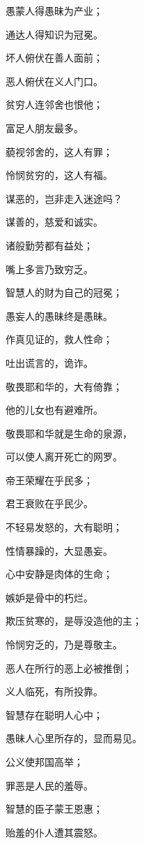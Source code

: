 {\par }{\Q {}愚蒙人得愚昧为产业；
\par }{\Q 通达人得知识为冠冕。
\par }{\Q {}坏人俯伏在善人面前；
\par }{\Q 恶人俯伏在义人门口。
\par }{\Q {}贫穷人连邻舍也恨他；
\par }{\Q 富足人朋友最多。
\par }{\Q {}藐视邻舍的，这人有罪；
\par }{\Q 怜悯贫穷的，这人有福。
\par }{\Q {}谋恶的，岂非走入迷途吗？
\par }{\Q 谋善的，{}慈爱和诚实。
\par }{\Q {}诸般勤劳都有益处；
\par }{\Q 嘴上多言乃致穷乏。
\par }{\Q {}智慧人的财为自己的冠冕；
\par }{\Q 愚妄人的愚昧终是愚昧。
\par }{\Q {}作真见证的，救人性命；
\par }{\Q 吐出谎言的，{}诡诈。
\par }{\Q {}敬畏耶和华的，大有倚靠；
\par }{\Q 他的儿女也有避难所。
\par }{\Q {}敬畏耶和华就是生命的泉源，
\par }{\Q 可以使人离开死亡的网罗。
\par }{\Q {}帝王荣耀在乎民多；
\par }{\Q 君王衰败在乎民少。
\par }{\Q {}不轻易发怒的，大有聪明；
\par }{\Q 性情暴躁的，大显愚妄。
\par }{\Q {}心中安静是肉体的生命；
\par }{\Q 嫉妒是骨中的朽烂。
\par }{\Q {}欺压贫寒的，是辱没造他的主；
\par }{\Q 怜悯穷乏的，乃是尊敬主。
\par }{\Q {}恶人在所行的恶上必被推倒；
\par }{\Q 义人临死，有所投靠。
\par }{\Q {}智慧存在聪明人心中；
\par }{\Q 愚昧人心里所存的，显而易见。
\par }{\Q {}公义使邦国高举；
\par }{\Q 罪恶是人民的羞辱。
\par }{\Q {}智慧的臣子蒙王恩惠；
\par }{\Q 贻羞的仆人遭其震怒。

}
